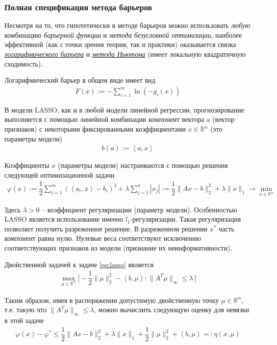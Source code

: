 \documentclass[%
	11pt,
	a4paper,
	utf8,
		]{article}
\begin{document}
\subsubsection{Полная спецификация метода барьеров}

Несмотря на то, что гипотетически в методе барьеров можно использовать \emph{любую} комбинацию \emph{барьерной функции} и \emph{метода безусловной оптимизации}, наиболее эффективной (как с точки зрения теория, так и практики) оказывается связка \emph{\underline{логарифмического барьера}} и \emph{\underline{метода Ньютона}} (имеет локальную квадратичную сходимость).

Логарифмический барьер в общем виде имеет вид
\begin{align*}
	F(x) := - \sum_{i=1}^m \ln (- g_i(x))
\end{align*}

В модели LASSO, как и в любой модели линейной регрессии, прогнозирование выполняется с помощью линейной комбинации компонент вектора $ a $ (вектор признаков) с некоторыми фиксированными коэффициентами $ x \in \mathbb{R}^n $ (это параметры модели)
\begin{align*}
	b(a) := \left< a, x \right>
\end{align*}

Коэффициенты $ x $ (параметры модели) настраиваются с помощью решения следующей оптимизационной задачи
\begin{align}\label{eq:lasso}
	\varphi(x) := \dfrac{1}{2} \sum_{i=1}^{m} (\left< a_i, x \right> - b_i)^2 + \lambda \sum_{j=1}^{n} | x_j | := \dfrac{1}{2} \| A x - b \|_2^2 + \lambda \| x \|_1 \rightarrow \min_{ x \in \mathbb{R}^n }
\end{align}

Здесь $ \lambda > 0 $ -- коэффициент регуляризации (параметр модели). Особенностью LASSO является использование имеено $ l_1 $-регуляризации. Такая регуляризация позволяет получить разреженное решение. В разреженном решении $ x^{*} $ часть компонент равна нулю. Нулевые веса соответствуют исключению соответствующих признаков из модели (признание их неинформативности).

Двойственной задачей к  задаче \eqref{eq:lasso} является
\begin{align*}\label{eq:dual_lasso}
	\max_{ \mu \in \mathbb{R}^n } \big[ - \dfrac{1}{2} \| \mu \|_2^2 - \left< b, \mu \right>: \| A^T \mu \|_{\infty} \leqslant \lambda \,\big]
\end{align*}

Таким образом, имея в распоряжении допустимую двойственную точку $ \mu \in \mathbb{R}^n $, т.е. такую что $ \| A^T \mu \|_{\infty} \leqslant \lambda $, можно вычислить следующую оценку для невязки в этой задаче
\begin{align}
	\varphi (x) - \varphi^{*} \leqslant \dfrac{1}{2} \| Ax - b \|_2^2 + \lambda \| x \|_1 + \dfrac{1}{2} \| \mu \|_2^2 + \left< b, \mu \right> =: \eta(x, \mu)
\end{align}
\end{document}
